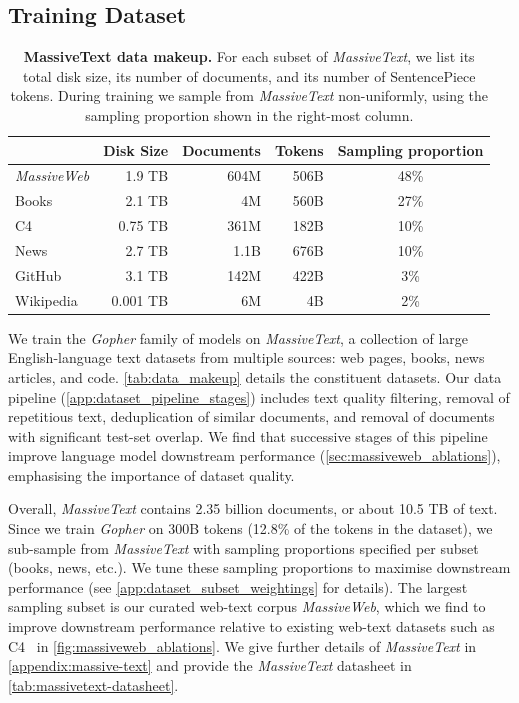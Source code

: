 \documentclass[11pt, a4paper, logo, internal, copyright, nonumbering]{deepmind}
\newcommand{\massivetext}{\textit{MassiveText}\xspace}
\newcommand{\massiveweb}{\textit{MassiveWeb}\xspace}
\newcommand{\gopher}{\textit{Gopher}\xspace}
\begin{document}
\subsection{Training Dataset}
\label{method:dataset}
\begin{table}[t]
\centering
\begin{tabular}{l r r r c}
\toprule
           & Disk Size & Documents & Tokens  & Sampling proportion \\ 
\midrule
\massiveweb & 1.9 TB  & 604M & 506B & 48\% \\
Books       & 2.1 TB  & 4M   & 560B & 27\% \\
C4          & 0.75 TB  & 361M & 182B & 10\% \\
News        & 2.7 TB  & 1.1B & 676B & 10\% \\
GitHub      & 3.1 TB  & 142M & 422B & 3\% \\ 
Wikipedia   & 0.001 TB & 6M   & 4B  & 2\% \\
\bottomrule
\end{tabular}
    \caption{\textbf{MassiveText data makeup.} For each subset of \massivetext, we list its total disk size, its number of documents, and its number of SentencePiece tokens. During training we sample from \massivetext non-uniformly, using the sampling proportion shown in the right-most column.}
    \label{tab:data_makeup}
\end{table}

We train the \gopher family of models on \massivetext, a collection of large English-language text datasets from multiple sources: web pages, books, news articles, and code. \autoref{tab:data_makeup} details the constituent datasets. Our data pipeline (\autoref{app:dataset_pipeline_stages}) includes text quality filtering, removal of repetitious text, deduplication of similar documents, and removal of documents with significant test-set overlap. 
We find that successive stages of this pipeline improve language model downstream performance (\autoref{sec:massiveweb_ablations}), emphasising the importance of dataset quality.

Overall, \massivetext contains 2.35 billion documents, or about 10.5 TB of text. 
Since we train \gopher on 300B tokens (12.8\% of the tokens in the dataset), we sub-sample from \massivetext with sampling proportions specified per subset (books, news, etc.). We tune these sampling proportions to maximise downstream performance (see \autoref{app:dataset_subset_weightings} for details). The largest sampling subset is our curated web-text corpus \massiveweb, which we find to improve downstream performance relative to existing web-text datasets such as C4~\citep{raffel2020exploring} in \autoref{fig:massiveweb_ablations}. 
We give further details of \massivetext in \autoref{appendix:massive-text} and provide the \massivetext datasheet in \autoref{tab:massivetext-datasheet}.
\end{document}
